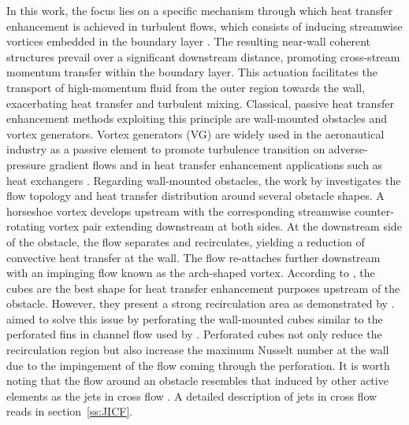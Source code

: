 In this work, the focus lies on a specific mechanism through which heat transfer enhancement is achieved in turbulent flows, which consists of inducing streamwise vortices embedded in the boundary layer \citep{jacobi1995}. The resulting near-wall coherent structures prevail over a significant downstream distance, promoting cross-stream momentum transfer within the boundary layer. This actuation facilitates the transport of high-momentum fluid from the outer region towards the wall, exacerbating heat transfer and turbulent mixing. Classical, passive heat transfer enhancement methods exploiting this principle are wall-mounted obstacles and vortex generators. 
Vortex generators (VG) are widely used in the aeronautical industry as a passive element to promote turbulence transition on adverse-pressure gradient flows \citep{Lin2002reviewVG} and in heat transfer enhancement applications such as heat exchangers \citep{Awais2018review}.  Regarding wall-mounted obstacles, the work by \citet{Chyu1996obstacles} investigates the flow topology and heat transfer distribution around several obstacle shapes. A horseshoe vortex develops upstream with the corresponding streamwise counter-rotating vortex pair extending downstream at both sides. At the downstream side of the obstacle, the flow separates and recirculates, yielding a reduction of convective heat transfer at the wall. The flow re-attaches further downstream with an impinging flow known as the arch-shaped vortex. According to \citet{Chyu1996obstacles}, the cubes are the best shape for heat transfer enhancement purposes upstream of the obstacle. However, they present a strong recirculation area as demonstrated by \citet{nakamura2001cube}. \citet{mallor2018cubes} aimed to solve this issue by perforating the wall-mounted cubes similar to the perforated fins in channel flow used by \citet{Hwang1995roughness}. Perforated cubes not only reduce the recirculation region but also increase the maximum Nusselt number at the wall due to the impingement of the flow coming through the perforation. It is worth noting that the flow around an obstacle resembles that induced by other active elements as the jets in cross flow \citep{fric_roshko_1994}. A detailed description of jets in cross flow reads in section~\ref{ss:JICF}.

